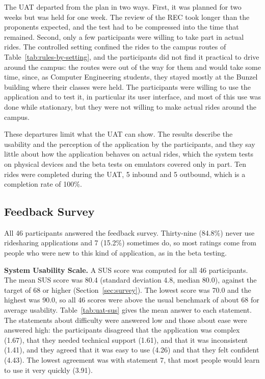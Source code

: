 The UAT departed from the plan in two ways. First, it was planned for two weeks but was held for one week. The review of the REC took longer than the proponents expected, and the test had to be compressed into the time that remained. Second, only a few participants were willing to take part in actual rides. The controlled setting confined the rides to the campus routes of Table~\ref{tab:rules-by-setting}, and the participants did not find it practical to drive around the campus: the routes were out of the way for them and would take some time, since, as Computer Engineering students, they stayed mostly at the Bunzel building where their classes were held. The participants were willing to use the application and to test it, in particular its user interface, and most of this use was done while stationary, but they were not willing to make actual rides around the campus.

These departures limit what the UAT can show. The results describe the usability and the perception of the application by the participants, and they say little about how the application behaves on actual rides, which the system tests on physical devices and the beta tests on emulators covered only in part. Ten rides were completed during the UAT, 5 inbound and 5 outbound, which is a completion rate of 100\%.

\subsection{Feedback Survey}
\label{sec:uat-feedback-results}
All 46 participants answered the feedback survey. Thirty-nine (84.8\%) never use ridesharing applications and 7 (15.2\%) sometimes do, so most ratings come from people who were new to this kind of application, as in the beta testing.

\textbf{System Usability Scale.} A SUS score was computed for all 46 participants. The mean SUS score was 80.4 (standard deviation 4.8, median 80.0), against the target of 68 or higher (Section~\ref{sec:survey}). The lowest score was 70.0 and the highest was 90.0, so all 46 scores were above the usual benchmark of about 68 for average usability. Table~\ref{tab:uat-sus} gives the mean answer to each statement. The statements about difficulty were answered low and those about ease were answered high: the participants disagreed that the application was complex (1.67), that they needed technical support (1.61), and that it was inconsistent (1.41), and they agreed that it was easy to use (4.26) and that they felt confident (4.43). The lowest agreement was with statement 7, that most people would learn to use it very quickly (3.91).

